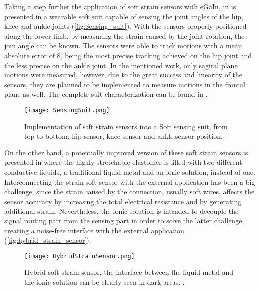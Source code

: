 Taking a step further the application of soft strain sensors with eGaIn, in \cite{mengucc2013soft} is presented in a wearable soft suit capable of sensing the joint angles of the hip, knee and ankle joints (\autoref{fig:Sensing_suit}). With the sensors properly positioned along the lower limb, by measuring the strain caused by the joint rotation, the join angle can be known. The sensors were able to track motions with a mean absolute error of 8\textdegree{}, being the most precise tracking achieved on the hip joint and the less precise on the ankle joint. In the mentioned work, only sagital plane motions were measured, however, due to the great success and linearity of the sensors, they are planned to be implemented to measure motions in the frontal plane as well. The complete suit characterization can be found in \cite{mengucc2014wearable}.

\begin{figure}[hbtp!]
    \centering
    \texttt{[image: SensingSuit.png]}
    \caption{Implementation of soft strain sensors into a Soft sensing suit, from top to bottom: hip sensor, knee sensor and ankle sensor position. \cite{mengucc2013soft}. }
    \label{fig:Sensing_suit}
\end{figure}

On the other hand, a potentially improved version of these soft strain sensors is presented in \cite{Chossat2013} where the highly stretchable elastomer is filled with two different conductive liquids, a traditional liquid metal and an ionic solution, instead of one. Interconnecting the strain soft sensor with the external application has been a big challenge, since the strain caused by the connection, usually soft wires, affects the sensor accuracy by increasing the total electrical resistance and by generating additional strain. Nevertheless, the ionic solution is intended to decouple the signal routing part from the sensing part in order to solve the latter challenge, creating a noise-free interface with the external application (\autoref{fig:hybrid_strain_sensor}).

\begin{figure}[hbtp!]
    \centering
    \texttt{[image: HybridStrainSensor.png]}
    \caption{Hybrid soft strain sensor, the interface between the liquid metal and the ionic solution can be clearly seen in dark areas. \cite{Chossat2013}. }
    \label{fig:hybrid_strain_sensor}
\end{figure}

